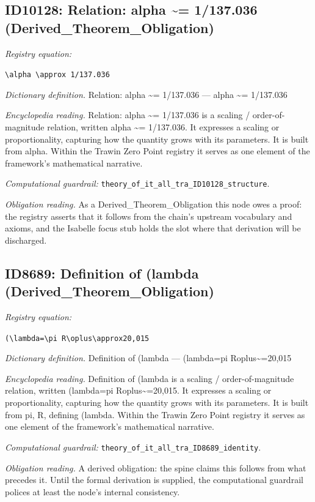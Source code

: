 \documentclass[11pt]{article}
\theoremstyle{remark}
\begin{document}
\subsection{ID10128: Relation: alpha \textasciitilde{}= 1/137.036 (Derived\_Theorem\_Obligation)}

\noindent\textit{Registry equation:}\par
{\small\texttt{\textbackslash{}alpha \textbackslash{}approx 1/137.036}}\par\medskip
\noindent\textit{Dictionary definition.} Relation: alpha \textasciitilde{}= 1/137.036 --- alpha \textasciitilde{}= 1/137.036\par\medskip
\noindent\textit{Encyclopedia reading.} Relation: alpha \textasciitilde{}= 1/137.036 is a scaling / order-of-magnitude relation, written alpha \textasciitilde{}= 1/137.036. It expresses a scaling or proportionality, capturing how the quantity grows with its parameters. It is built from alpha. Within the Trawin Zero Point registry it serves as one element of the framework's mathematical narrative.
\par\medskip\noindent\textit{Computational guardrail:} \texttt{theory\_of\_it\_all\_tra\_ID10128\_structure}.
\par\medskip\noindent\textit{Obligation reading.} As a Derived\_Theorem\_Obligation this node owes a proof: the registry asserts that it follows from the chain's upstream vocabulary and axioms, and the Isabelle focus stub holds the slot where that derivation will be discharged.

\subsection{ID8689: Definition of (lambda (Derived\_Theorem\_Obligation)}

\noindent\textit{Registry equation:}\par
{\small\texttt{(\textbackslash{}lambda=\textbackslash{}pi R\textbackslash{}oplus\textbackslash{}approx20,015}}\par\medskip
\noindent\textit{Dictionary definition.} Definition of (lambda --- (lambda=pi Roplus\textasciitilde{}=20,015\par\medskip
\noindent\textit{Encyclopedia reading.} Definition of (lambda is a scaling / order-of-magnitude relation, written (lambda=pi Roplus\textasciitilde{}=20,015. It expresses a scaling or proportionality, capturing how the quantity grows with its parameters. It is built from pi, R, defining (lambda. Within the Trawin Zero Point registry it serves as one element of the framework's mathematical narrative.
\par\medskip\noindent\textit{Computational guardrail:} \texttt{theory\_of\_it\_all\_tra\_ID8689\_identity}.
\par\medskip\noindent\textit{Obligation reading.} A derived obligation: the spine claims this follows from what precedes it. Until the formal derivation is supplied, the computational guardrail polices at least the node's internal consistency.
\end{document}
